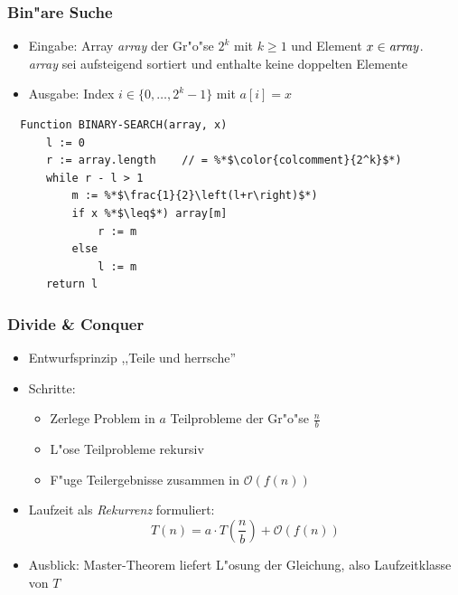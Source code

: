 \documentclass[t]{beamer}
\newcommand{\bigO}{\ensuremath{\mathcal{O}}}
\begin{document}
\begin{frame}[fragile]
  \frametitle{Bin"are Suche}
  \begin{itemize}
  \item Eingabe: Array \emph{array} der Gr"o"se $2^k$ mit $k \geq 1$ und Element
                 $x \in \text{\emph{array}}$. \\
                 \emph{array} sei aufsteigend sortiert und enthalte
                 keine doppelten Elemente
  \item Ausgabe: Index $i \in \{0,\ldots,2^k-1\}$ mit $a[i] = x$
  \end{itemize}
  \begin{lstlisting}
  Function BINARY-SEARCH(array, x)
      l := 0
      r := array.length    // = %*$\color{colcomment}{2^k}$*)
      while r - l > 1
          m := %*$\frac{1}{2}\left(l+r\right)$*)
          if x %*$\leq$*) array[m]
              r := m
          else
              l := m
      return l
  \end{lstlisting}
\end{frame}

\begin{frame}
  \frametitle{Divide \& Conquer}
  \begin{itemize}
  \item Entwurfsprinzip ,,Teile und herrsche''
  \item Schritte:
    \begin{itemize}
    \item Zerlege Problem in $a$ Teilprobleme der Gr"o"se $\frac{n}{b}$
    \item L"ose Teilprobleme rekursiv
    \item F"uge Teilergebnisse zusammen in $\bigO(f(n))$
    \end{itemize}
  \item Laufzeit als \emph{Rekurrenz} formuliert:
    \[T(n) = a\cdot T\left(\frac{n}{b}\right) + \bigO(f(n))\]
  \item Ausblick: Master-Theorem liefert L"osung der Gleichung, also Laufzeitklasse von
        $T$
  \end{itemize}
\end{frame}
\end{document}
